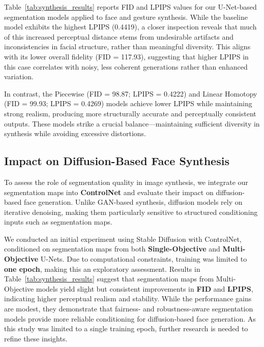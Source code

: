 Table~\ref{tab:synthesis_results} reports FID and LPIPS values for our U-Net-based segmentation models applied to face and gesture synthesis. While the baseline model exhibits the highest LPIPS (0.4419), a closer inspection reveals that much of this increased perceptual distance stems from undesirable artifacts and inconsistencies in facial structure, rather than meaningful diversity. This aligns with its lower overall fidelity (FID = 117.93), suggesting that higher LPIPS in this case correlates with noisy, less coherent generations rather than enhanced variation.

In contrast, the Piecewise (FID = 98.87; LPIPS = 0.4222) and Linear Homotopy (FID = 99.93; LPIPS = 0.4269) models achieve lower LPIPS while maintaining strong realism, producing more structurally accurate and perceptually consistent outputs. These models strike a crucial balance—maintaining sufficient diversity in synthesis while avoiding excessive distortions.

\subsection{Impact on Diffusion-Based Face Synthesis}
\label{subsec:diffusion_results}

To assess the role of segmentation quality in image synthesis, we integrate our segmentation maps into \textbf{ControlNet} and evaluate their impact on diffusion-based face generation. Unlike GAN-based synthesis, diffusion models rely on iterative denoising, making them particularly sensitive to structured conditioning inputs such as segmentation maps.

We conducted an initial experiment using Stable Diffusion with ControlNet, conditioned on segmentation maps from both \textbf{Single-Objective} and \textbf{Multi-Objective} U-Nets. Due to computational constraints, training was limited to \textbf{one epoch}, making this an exploratory assessment. Results in Table~\ref{tab:synthesis_results} suggest that segmentation maps from Multi-Objective models yield slight but consistent improvements in \textbf{FID} and \textbf{LPIPS}, indicating higher perceptual realism and stability. While the performance gains are modest, they demonstrate that fairness- and robustness-aware segmentation models provide more reliable conditioning for diffusion-based face generation. As this study was limited to a single training epoch, further research is needed to refine these insights. 

